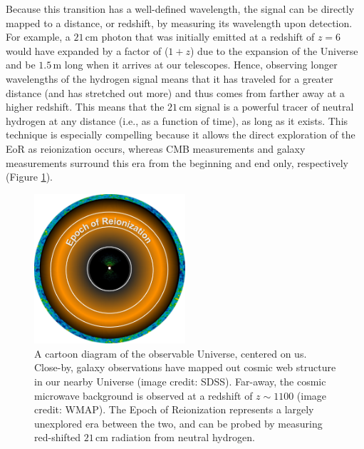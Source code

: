 Because this transition has a well-defined wavelength, the signal can be directly mapped to a distance, or redshift, by measuring its wavelength upon detection. For example, a $21$\,cm photon that was initially emitted at a redshift of $z = 6$ would have expanded by a factor of ($1+z$) due to the expansion of the Universe and be $1.5$\,m long when it arrives at our telescopes. Hence, observing longer wavelengths of the hydrogen signal means that it has traveled for a greater distance (and has stretched out more) and thus comes from farther away at a higher redshift. This means that the $21$\,cm signal is a powerful tracer of neutral hydrogen at any distance (i.e., as a function of time), as long as it exists. This technique is especially compelling because it allows the direct exploration of the EoR as reionization occurs, whereas CMB measurements and galaxy measurements surround this era from the beginning and end only, respectively (Figure \ref{fig:timeline_circle}).

\begin{figure}
	\centering
	\includegraphics[width=0.5\textwidth]{plots/timeline_circle.pdf}
	\caption{A cartoon diagram of the observable Universe, centered on us. Close-by, galaxy observations have mapped out cosmic web structure in our nearby Universe (image credit: SDSS). Far-away, the cosmic microwave background is observed at a redshift of $z \sim 1100$ (image credit: WMAP). The Epoch of Reionization represents a largely unexplored era between the two, and can be probed by measuring red-shifted $21$\,cm radiation from neutral hydrogen.}
	\label{fig:timeline_circle}
\end{figure}

